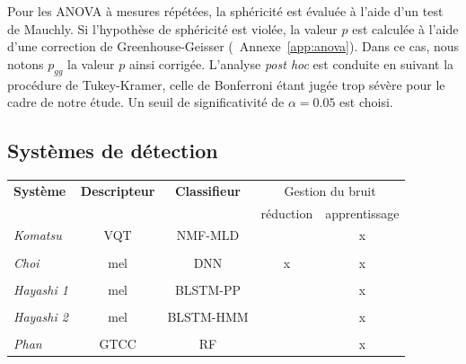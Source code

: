 Pour les ANOVA à mesures répétées, la sphéricité est évaluée à l'aide d'un test de Mauchly. Si l'hypothèse de sphéricité est violée, la valeur $p$ est calculée à l'aide d'une correction de Greenhouse-Geisser (\cf~Annexe~\ref{app:anova}). Dans ce cas, nous notons $p_{gg}$ la valeur $p$ ainsi corrigée. L'analyse \emph{post hoc} est conduite en suivant la procédure de Tukey-Kramer, celle de Bonferroni étant jugée trop sévère pour le cadre de notre étude. Un seuil de significativité de $\alpha=0.05$ est choisi.

\subsection{Systèmes de détection}

\begin{table}[t]
\begin{center}
\scriptsize
\begin{tabular}{lcccc}
\textbf{Système}             & \textbf{Descripteur}         & \textbf{Classifieur} &   \multicolumn{2}{c}{Gestion du bruit} \\ 
                             &                              &                      & réduction & apprentissage   \\ 
\hline
\emph{Komatsu}               &     VQT                      & NMF-MLD              &           & x \\ 
\citep{Komatsu2016}          &                              &                      &           &   \\ 
\hline
\emph{Choi}                  &     mel                      & DNN                  & x         & x \\ 
\citep{Choi2016}             &                              &                      &           & \\ 
\hline
\emph{Hayashi 1}             &     mel                      & BLSTM-PP             &           & x \\ 
\citep{Hayashi2016}          &                              &                      &           & \\ 
\hline
\emph{Hayashi 2}             &     mel                      & BLSTM-HMM            &           & x \\ 
\citep{Hayashi2016}          &                              &                      &           & \\ 
\hline
\emph{Phan}                  &     GTCC                     & RF                   &           & x\\ 

\end{tabular}
\end{center}
\end{table}
